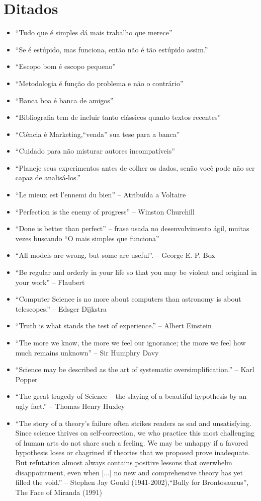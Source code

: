\section{Ditados}
\begin{itemize}
\item ``Tudo que é simples dá mais trabalho que merece''
\item ``Se é estúpido, mas funciona, então não é tão estúpido assim.''
\item ``Escopo bom é escopo pequeno''
\item ``Metodologia é função do problema e não o contrário''
\item ``Banca boa é banca de amigos''
\item ``Bibliografia tem de incluir tanto clássicos quanto textos recentes''
\item ``Ciência é Marketing,``venda'' sua tese para a banca''
\item ``Cuidado para não misturar autores incompatíveis''
\item ``Planeje seus experimentos antes de colher os dados, senão você pode não ser capaz de analisá-los.''
\item ``Le mieux est l’ennemi du bien'' -- Atribuída a Voltaire
\item ``Perfection is the enemy of progress'' -- Winston Churchill
\item ``Done is better than perfect'' -- frase usada no desenvolvimento ágil, muitas vezes buscando ``O mais simples que funciona''
\item ``All models are wrong, but some are useful''.  --  George E. P. Box
\item ``Be regular and orderly in your life so that you may be violent and original in your work''  --  Flaubert
\item ``Computer Science is no more about computers than astronomy is about telescopes.''  --  Edsger Dijkstra
\item ``Truth is what stands the test of experience.''  --  Albert Einstein
\item ``The more we know, the more we feel our ignorance; the more we feel how much remains unknown'' --  Sir Humphry Davy
\item ``Science may be described as the art of systematic oversimplification.''  --   Karl Popper
\item ``The great tragedy of Science  --     the slaying of a beautiful hypothesis by an ugly fact.''  --   Thomas Henry Huxley
\item ``The story of a theory's failure often strikes readers as sad and unsatisfying. Since science thrives on self-correction, we who practice this most challenging of human arts do not share such a feeling. We may be unhappy if a favored hypothesis loses or chagrined if theories that we proposed prove inadequate. But refutation almost always contains positive lessons that overwhelm disappointment, even when [...] no new and comprehensive theory has yet filled the void.''  --   Stephen Jay Gould (1941-2002),``Bully for Brontosaurus'', The Face of Miranda (1991)

\end{itemize}
